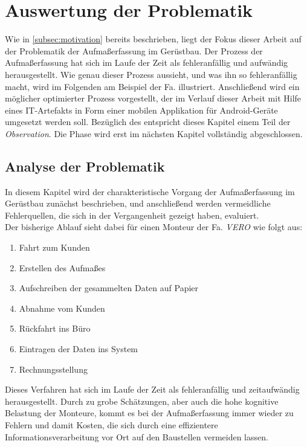 \chapter{Auswertung der Problematik}\label{chap:problem}
Wie in \autoref{subsec:motivation} bereits beschrieben, liegt der Fokus dieser Arbeit auf der Problematik der Aufmaßerfassung im Gerüstbau. 
Der Prozess der Aufmaßerfassung hat sich im Laufe der Zeit als fehleranfällig und aufwändig herausgestellt.
Wie genau dieser Prozess aussieht, und was ihn so fehleranfällig macht, wird im Folgenden am Beispiel der Fa. \vr{} illustriert.
Anschließend wird ein möglicher optimierter Prozess vorgestellt, der im Verlauf dieser Arbeit mit Hilfe eines IT-Artefakts in Form einer mobilen Applikation für Android-Geräte umgesetzt werden soll.
Bezüglich des \hcdp{} entspricht dieses Kapitel einem Teil der \emph{Observation}.
Die Phase wird erst im nächsten Kapitel vollständig abgeschlossen.

\section{Analyse der Problematik}\label{sec:problem}
In diesem Kapitel wird der charakteristische Vorgang der Aufmaßerfassung im Gerüstbau zunächst beschrieben, und anschließend werden vermeidliche Fehlerquellen, die sich in der Vergangenheit gezeigt haben, evaluiert. \\

Der bisherige Ablauf sieht dabei für einen Monteur der Fa. \emph{VERO} wie folgt aus:
\begin{enumerate}
  \item Fahrt zum Kunden
  \item Erstellen des Aufmaßes
  \item Aufschreiben der gesammelten Daten auf Papier \label{itm:paper}
  \item Abnahme vom Kunden
  \item Rückfahrt ins Büro
  \item Eintragen der Daten ins System \label{itm:system}
  \item Rechnungsstellung
\end{enumerate}

\noindent
Dieses Verfahren hat sich im Laufe der Zeit als fehleranfällig und zeitaufwändig herausgestellt. 
Durch zu grobe Schätzungen, aber auch die hohe kognitive Belastung der Monteure, kommt es bei der Aufmaßerfassung immer wieder zu Fehlern und damit Kosten, die sich durch eine effizientere Informationsverarbeitung vor Ort auf den Baustellen vermeiden lassen. \\


